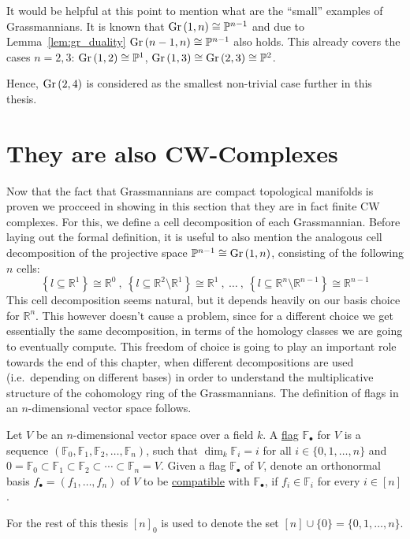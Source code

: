 It would be helpful at this point to mention what are the ``small'' examples of Grassmannians. It is known that $\Gr{1}{n}\cong\mathbb{P}^{n-1}$ and due to Lemma~\ref{lem:gr_duality} $\Gr{n-1}{n}\cong\mathbb{P}^{n-1}$ also holds. This already covers the cases $n=2,3$:
$\Gr{1}{2}\cong\mathbb{P}^1$, $\Gr{1}{3}\cong\Gr{2}{3}\cong\mathbb{P}^2$.

Hence, $\Gr{2}{4}$ is considered as the smallest non-trivial case further in this thesis.

\section{They are also CW-Complexes}
Now that the fact that Grassmannians are compact topological manifolds is proven we procceed in showing in this section that they are in fact finite CW complexes.
For this, we define a cell decomposition of each Grassmannian. Before laying out the formal definition, it is useful to also mention the analogous cell decomposition of the projective space $\mathbb{P}^{n-1}\cong\Gr{1}{n}$, consisting of the following $n$ cells:
\[\left\{l\subseteq\mathbb{R}^1\right\}\cong\mathbb{R}^0\ ,\ \left\{l\subseteq\mathbb{R}^2\setminus\mathbb{R}^1\right\}\cong\mathbb{R}^1\ ,\ \ldots\ ,\ \left\{l\subseteq\mathbb{R}^n\setminus\mathbb{R}^{n-1}\right\}\cong\mathbb{R}^{n-1}\]
This cell decomposition seems natural, but it depends heavily on our basis choice for $\mathbb{R}^n$. This however doesn't cause a problem, since for a different choice we get essentially the same decomposition, in terms of the homology classes we are going to eventually compute. This freedom of choice is going to play an important role towards the end of this chapter, when different decompositions are used (i.e.\ depending on different bases) in order to understand the multiplicative structure of the cohomology ring of the Grassmannians. The definition of flags in an $n$-dimensional vector space follows.

\begin{definition} Let $V$ be an $n$-dimensional vector space over a field $k$. A \ul{flag} $\mathbb{F}_{\bullet}$ for $V$ is a sequence $\left(\mathbb{F}_0,\mathbb{F}_1,\mathbb{F}_2,\ldots,\mathbb{F}_n\right)$, such that $\dim_k\mathbb{F}_i = i$ for all $i\in\{0,1,\ldots,n\}$ and
$0=\mathbb{F}_0\subset\mathbb{F}_1\subset\mathbb{F}_2\subset\cdots\subset\mathbb{F}_n=V$.
Given a flag $\mathbb{F}_{\bullet}$ of $V$, denote an orthonormal basis $f_{\bullet}=(f_1,\ldots,f_n)$ of $V$ to be \ul{compatible} with $\mathbb{F}_{\bullet}$, if
$f_i\in\mathbb{F}_i$
for every $i\in[n]$.
\end{definition}
For the rest of this thesis ${[n]}_0$ is used to denote the set $[n]\cup\{0\}=\{0,1,\ldots,n\}$.

